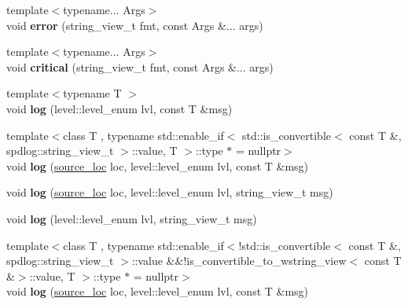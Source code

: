 \begin{DoxyCompactItemize}
{\footnotesize template$<$typename... Args$>$ }\\void {\bfseries error} (string\+\_\+view\+\_\+t fmt, const Args \&... args)
\item 
\mbox{\label{classspdlog_1_1logger_acf5b06facde81b17d08b2ad1a70c970a}} 
{\footnotesize template$<$typename... Args$>$ }\\void {\bfseries critical} (string\+\_\+view\+\_\+t fmt, const Args \&... args)
\item 
\mbox{\label{classspdlog_1_1logger_a1c9edb4ac399c6167c1a9c6ccef9dd74}} 
{\footnotesize template$<$typename T $>$ }\\void {\bfseries log} (level\+::level\+\_\+enum lvl, const T \&msg)
\item 
\mbox{\label{classspdlog_1_1logger_a044247975b854cb3812f245ffb08c818}} 
{\footnotesize template$<$class T , typename std\+::enable\+\_\+if$<$ std\+::is\+\_\+convertible$<$ const T \&, spdlog\+::string\+\_\+view\+\_\+t $>$\+::value, T $>$\+::type $\ast$  = nullptr$>$ }\\void {\bfseries log} (\hyperlink{structspdlog_1_1source__loc}{source\+\_\+loc} loc, level\+::level\+\_\+enum lvl, const T \&msg)
\item 
\mbox{\label{classspdlog_1_1logger_ae25e7b37fd89b1c1dce80abc1c388469}} 
void {\bfseries log} (\hyperlink{structspdlog_1_1source__loc}{source\+\_\+loc} loc, level\+::level\+\_\+enum lvl, string\+\_\+view\+\_\+t msg)
\item 
\mbox{\label{classspdlog_1_1logger_ad7532e31ce265eb79a8c2957eba7ec95}} 
void {\bfseries log} (level\+::level\+\_\+enum lvl, string\+\_\+view\+\_\+t msg)
\item 
\mbox{\label{classspdlog_1_1logger_a044247975b854cb3812f245ffb08c818}} 
{\footnotesize template$<$class T , typename std\+::enable\+\_\+if$<$!std\+::is\+\_\+convertible$<$ const T \&, spdlog\+::string\+\_\+view\+\_\+t $>$\+::value \&\&!is\+\_\+convertible\+\_\+to\+\_\+wstring\+\_\+view$<$ const T \&$>$\+::value, T $>$\+::type $\ast$  = nullptr$>$ }\\void {\bfseries log} (\hyperlink{structspdlog_1_1source__loc}{source\+\_\+loc} loc, level\+::level\+\_\+enum lvl, const T \&msg)

\end{DoxyCompactItemize}
